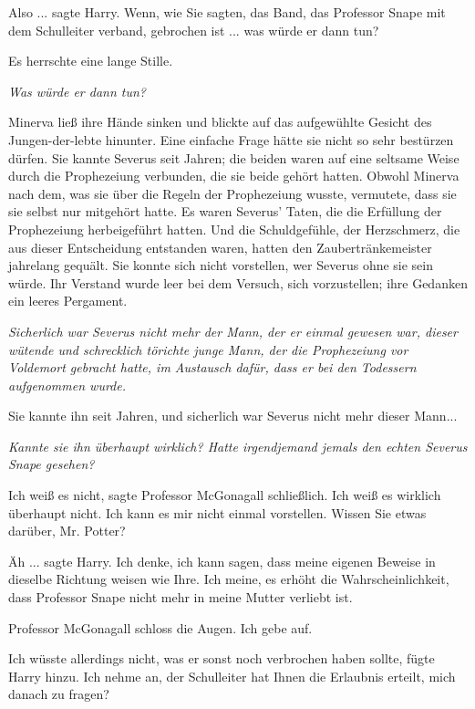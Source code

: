 \glqq{}Also ...\grqq{} sagte Harry. \glqq{}Wenn, wie Sie sagten, das Band, das
Professor Snape mit dem Schulleiter verband, gebrochen ist ... was würde er dann
tun?\grqq{}

Es herrschte eine lange Stille.

\emph{Was würde er dann tun?}

Minerva ließ ihre Hände sinken und blickte auf das aufgewühlte Gesicht des
Jungen-der-lebte hinunter. Eine einfache Frage hätte sie nicht so sehr bestürzen
dürfen. Sie kannte Severus seit Jahren; die beiden waren auf eine seltsame Weise
durch die Prophezeiung verbunden, die sie beide gehört hatten. Obwohl Minerva
nach dem, was sie über die Regeln der Prophezeiung wusste, vermutete, dass sie
sie selbst nur mitgehört hatte. Es waren Severus' Taten, die die Erfüllung der
Prophezeiung herbeigeführt hatten. Und die Schuldgefühle, der Herzschmerz, die
aus dieser Entscheidung entstanden waren, hatten den Zaubertränkemeister
jahrelang gequält. Sie konnte sich nicht vorstellen, wer Severus ohne sie sein
würde. Ihr Verstand wurde leer bei dem Versuch, sich vorzustellen; ihre Gedanken
ein leeres Pergament.

\emph{Sicherlich war Severus nicht mehr der Mann, der er einmal gewesen war,
dieser wütende und schrecklich törichte junge Mann, der die Prophezeiung vor
Voldemort gebracht hatte, im Austausch dafür, dass er bei den Todessern
aufgenommen wurde.}

Sie kannte ihn seit Jahren, und sicherlich war Severus nicht mehr dieser Mann...

\emph{Kannte sie ihn überhaupt wirklich? Hatte irgendjemand jemals den echten
Severus Snape gesehen?}

\glqq{}Ich weiß es nicht\grqq{}, sagte Professor McGonagall schließlich. \glqq{}
Ich weiß es wirklich überhaupt nicht. Ich kann es mir nicht einmal vorstellen.
Wissen Sie etwas darüber, Mr. Potter?\grqq{}

\glqq{}Äh ...\grqq{} sagte Harry. \glqq{}Ich denke, ich kann sagen, dass meine
eigenen Beweise in dieselbe Richtung weisen wie Ihre. Ich meine, es erhöht die
Wahrscheinlichkeit, dass Professor Snape nicht mehr in meine Mutter verliebt
ist.\grqq{}

Professor McGonagall schloss die Augen. \glqq{}Ich gebe auf.\grqq{}

\glqq{}Ich wüsste allerdings nicht, was er sonst noch verbrochen haben
sollte\grqq{}, fügte Harry hinzu. \glqq{}Ich nehme an, der Schulleiter hat Ihnen
die Erlaubnis erteilt, mich danach zu fragen?\grqq{}

